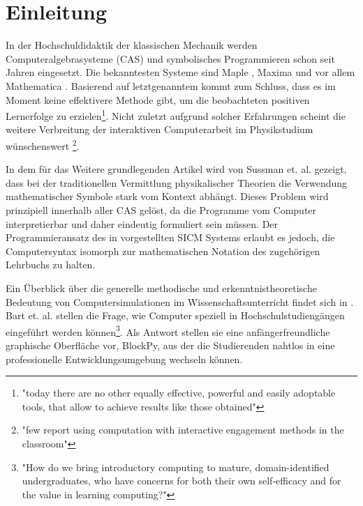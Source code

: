 \documentclass[twocolumn, 10pt]{article}
\begin{document}
\section{Einleitung}
In der Hochschuldidaktik der klassischen Mechanik werden Computeralgebrasysteme (CAS) und symbolisches Programmieren schon seit Jahren eingesetzt. Die bekanntesten Systeme sind Maple \cite{cSpencer 1}, Maxima \cite{cTimber 2} und vor allem Mathematica \cite{cRobi 3}. Basierend auf letztgenanntem kommt \cite{cBerta 4} zum Schluss, dass es im Moment keine effektivere Methode gibt, um die beobachteten positiven Lernerfolge zu erzielen\footnote{"today there are no other equally effective, powerful and easily adoptable tools, that allow to achieve results like those obtained"}. Nicht zuletzt aufgrund solcher Erfahrungen scheint die weitere Verbreitung der interaktiven Computerarbeit im Physikstudium wünschenswert \cite{cCaballero 5}\footnote{"few report using computation with interactive engagement methods in the classroom"}.

In dem für das Weitere grundlegenden Artikel \cite{cSussmanPaper 6} wird von Sussman et. al. gezeigt, dass bei der traditionellen Vermittlung physikalischer Theorien die Verwendung mathematischer Symbole stark vom Kontext abhängt. Dieses Problem wird prinzipiell innerhalb aller CAS gelöst, da die Programme vom Computer interpretierbar und daher eindeutig formuliert sein müssen. Der Programmieransatz des in \cite{cSussmanPaper 6} vorgestellten SICM Systems erlaubt es jedoch, die Computersyntax isomorph zur mathematischen Notation des zugehörigen Lehrbuchs \cite{cSICM 7} zu halten.

Ein Überblick über die generelle methodische und erkenntnistheoretische Bedeutung von Computersimulationen im Wissenschaftsunterricht findet sich in \cite{cDevelaki 8}. Bart et. al. \cite{cBartPos 9} stellen die Frage, wie Computer speziell in Hochschulstudiengängen eingeführt werden können\footnote{"How do we bring introductory computing to mature, domain-identified undergraduates, who have concerns for both their own self-efficacy and for the value in learning computing?"}. Als Antwort stellen sie eine anfängerfreundliche graphische Oberfläche vor, BlockPy, aus der die Studierenden nahtlos in eine professionelle Entwicklungsumgebung wechseln können.
\end{document}
